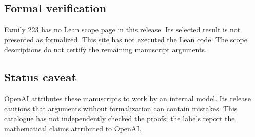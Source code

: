 \documentclass[11pt]{article}
\begin{document}
\subsection{Formal verification}
Family 223 has no Lean scope page in this release. Its selected result is not presented as formalized. This site has not executed the Lean code. The scope descriptions do not certify the remaining manuscript arguments.

\subsection{Status caveat}
OpenAI attributes these manuscripts to work by an internal model. Its release cautions that arguments without formalization can contain mistakes. This catalogue has not independently checked the proofs; the labels report the mathematical claims attributed to OpenAI.
\end{document}
